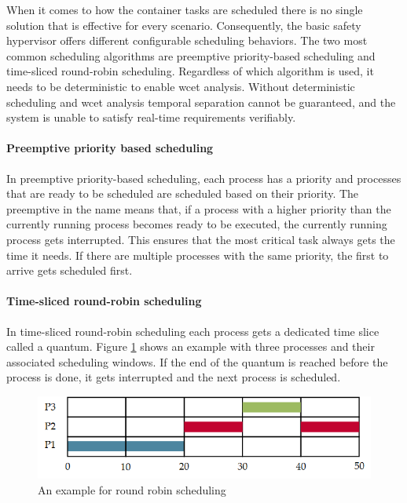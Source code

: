 When it comes to how the container tasks are scheduled there is no single solution that is effective for every scenario. Consequently, the basic safety hypervisor offers different configurable scheduling behaviors. The two most common scheduling algorithms are preemptive priority-based scheduling and time-sliced round-robin scheduling. Regardless of which algorithm is used, it needs to be deterministic to enable \acrlong{wcet} analysis. Without deterministic scheduling and \acrshort{wcet} analysis temporal separation cannot be guaranteed, and the system is unable to satisfy real-time requirements verifiably.

\paragraph{Preemptive priority based scheduling}
In preemptive priority-based scheduling, each process has a priority and processes that are ready to be scheduled are scheduled based on their priority.
The preemptive in the name means that, if a process with a higher priority than the currently running process becomes ready to be executed, the currently running process gets interrupted. This ensures that the most critical task always gets the time it needs. If there are multiple processes with the same priority, the first to arrive gets scheduled first.

\paragraph{Time-sliced round-robin scheduling}
In time-sliced round-robin scheduling each process gets a dedicated time slice called a quantum. Figure \ref{fig:round_robin_example}  shows an example with three processes and their associated scheduling windows. If the end of the quantum is reached before the process is done, it gets interrupted and the next process is scheduled.
\begin{figure}[ht!]
\centering
\includegraphics[scale=0.75]{Figures/round_robin_example.png}
\decoRule
\caption{An example for round robin scheduling}
\label{fig:round_robin_example}
\end{figure}

